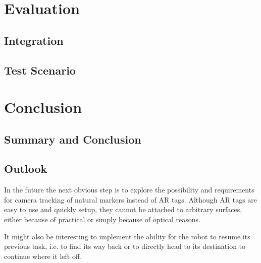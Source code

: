 \chapter{Evaluation}
\section{Integration}
\section{Test Scenario}
\chapter{Conclusion}
\section{Summary and Conclusion}
\section{Outlook}
In the future the next obvious step is to explore the possibility and requirements for camera tracking of natural markers instead of AR tags. Although AR tags are easy to use and quickly setup, they cannot be attached to arbitrary surfaces, either because of practical or simply because of optical reasons.

It might also be interesting to implement the ability for the robot to resume its previous task, i.e. to find its way back or to directly head to its destination to continue where it left off.